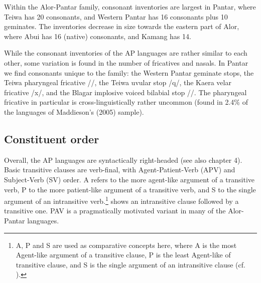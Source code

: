 Within the Alor-Pantar family, consonant inventories are largest in Pantar, where Teiwa has 20 consonants, and Western Pantar has 16 consonants plus 10 geminates. The inventories decrease in size towards the eastern part of Alor, where Abui has 16 (native) consonants, and Kamang has 14. 

While the consonant inventories of the AP languages are rather similar to each other, some variation is found in the number of fricatives and nasals. In Pantar we find consonants unique to the family: the Western Pantar geminate stops, the Teiwa pharyngeal fricative /{\pharfric}/, the Teiwa uvular stop /q/, the Kaera velar fricative /x/, and the Blagar implosive voiced bilabial stop /{\texthtb}/. The pharyngeal fricative in particular is cross-linguistically rather uncommon (found in 2.4\% of  the languages of Maddieson's (2005) sample). \nocite{Maddieson2005}

\subsection{Constituent order}
Overall, the AP languages are syntactically right-headed (see also chapter 4). Basic transitive clauses are verb-final, with Agent-Patient-Verb (APV) and Subject-Verb (SV) order. A refers to the more agent-like argument of a transitive verb, P to the more patient-like argument of a transitive verb, and S to the single argument of an intransitive verb.\footnote{A, P and S are used as comparative concepts here, where A is the most Agent-like argument of a transitive clause, P is the least Agent-like of transitive clause, and S is the single argument of an intransitive clause (cf. \citealt{Comrie1989,Haspelmath2011}).}   shows an intransitive clause followed by a transitive one. PAV is a pragmatically motivated variant in many of the Alor-Pantar languages.



